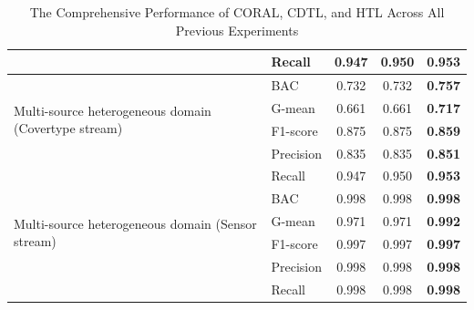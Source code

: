 \begin{table}[h]
{\begin{tabular}{|l|l|c|c|c|}
                                                 & Recall          & 0.947          & 0.950         & \textbf{0.953} \\ \hline
  \multirow{4}{*}{Multi-source heterogeneous domain (Covertype stream)} & BAC & 0.732  & 0.732         & \textbf{0.757} \\ \cline{2-5} 
                                                 & G-mean          & 0.661          & 0.661         & \textbf{0.717} \\ \cline{2-5} 
                                                 & F1-score        & 0.875          & 0.875         & \textbf{0.859} \\ \cline{2-5} 
                                                 & Precision       & 0.835          & 0.835         & \textbf{0.851} \\ \cline{2-5} 
                                                 & Recall          & 0.947          & 0.950         & \textbf{0.953} \\ \hline
  \multirow{4}{*}{Multi-source heterogeneous domain (Sensor stream)} & BAC & 0.998  & 0.998         & \textbf{0.998} \\ \cline{2-5} 
                                                 & G-mean          & 0.971          & 0.971         & \textbf{0.992} \\ \cline{2-5} 
                                                 & F1-score        & 0.997          & 0.997         & \textbf{0.997} \\ \cline{2-5} 
                                                 & Precision       & 0.998          & 0.998         & \textbf{0.998} \\ \cline{2-5} 
                                                 & Recall          & 0.998          & 0.998         & \textbf{0.998} \\ \hline
  \end{tabular}
  }
  \caption{The Comprehensive Performance of CORAL, CDTL, and HTL Across All Previous Experiments}
  \label{table:6_table2}
  \end{table}

